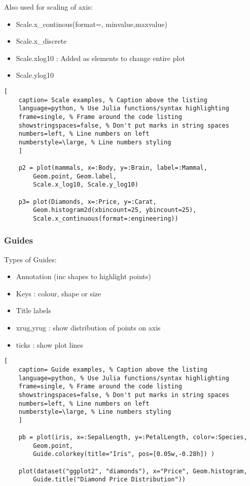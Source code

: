 \documentclass[11pt]{scrartcl} %
\begin{document}
Also used for scaling of axis:

\begin{itemize}
	\item Scale.x\_continous(format=, minvalue,maxvalue)
	\item Scale.x\_discrete
	\item Scale.xlog10 : Added as elements to change entire plot
	\item Scale.ylog10
\end{itemize}

\begin{lstlisting}[
	caption= Scale examples, % Caption above the listing
	language=python, % Use Julia functions/syntax highlighting
	frame=single, % Frame around the code listing
	showstringspaces=false, % Don't put marks in string spaces
	numbers=left, % Line numbers on left
	numberstyle=\large, % Line numbers styling
	]

	p2 = plot(mammals, x=:Body, y=:Brain, label=:Mammal, 
		Geom.point, Geom.label,
		Scale.x_log10, Scale.y_log10)

	p3= plot(Diamonds, x=:Price, y=:Carat, 
		Geom.histogram2d(xbincount=25, ybincount=25),
    	Scale.x_continuous(format=:engineering))

\end{lstlisting}

\subsubsection{Guides}

Types of Guides:
\begin{itemize}
	\item Annotation (inc shapes to highlight points)
	\item Keys : colour, shape or size
	\item Title labels
	\item xrug,yrug : show distribution of points on axis
	\item ticks : show plot lines
\end{itemize}

\begin{lstlisting}[
	caption= Guide examples, % Caption above the listing
	language=python, % Use Julia functions/syntax highlighting
	frame=single, % Frame around the code listing
	showstringspaces=false, % Don't put marks in string spaces
	numbers=left, % Line numbers on left
	numberstyle=\large, % Line numbers styling
	]

	pb = plot(iris, x=:SepalLength, y=:PetalLength, color=:Species, 
		Geom.point,
        Guide.colorkey(title="Iris", pos=[0.05w,-0.28h]) )

	plot(dataset("ggplot2", "diamonds"), x="Price", Geom.histogram,
		Guide.title("Diamond Price Distribution"))

\end{lstlisting}
\end{document}
